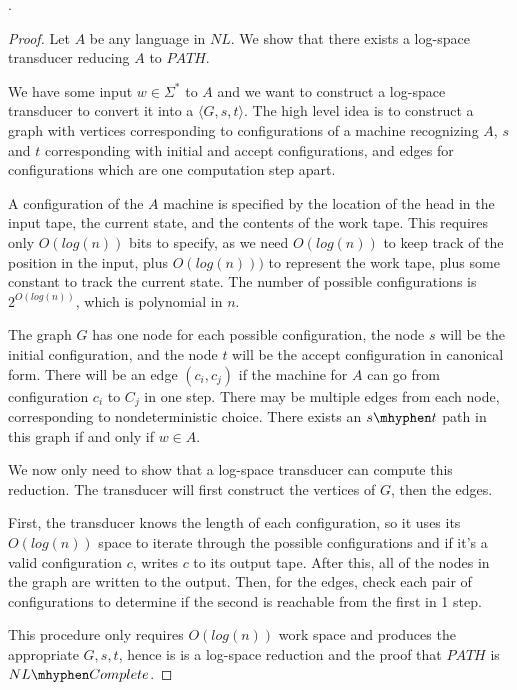 	. 
\begin{proof}	 
	
	Let $A$ be any language in $NL$.  We show that there exists a log-space transducer reducing $A$ to $PATH$.
	
	We have some input $w\in\Sigma^*$ to $A$ and we want to construct a log-space transducer to convert it into a $\langle G,s,t\rangle$.  The high level idea is to construct a graph with vertices corresponding to configurations of a machine recognizing $A$, $s$ and $t$ corresponding with initial and accept configurations, and edges for configurations which are one computation step apart.
	
	A configuration of the $A$ machine is specified by the location of the head in the input tape, the current state, and the contents of the work tape.  This requires only $O(log(n))$ bits to specify, as we need $O(log(n))$ to keep track of the position in the input, plus $O(log(n)))$ to represent the work tape, plus some constant to track the current state.  The number of possible configurations is $2^{O(log(n))}$, which is polynomial in $n$.
	
	The graph $G$ has one node for each possible configuration, the node $s$ will be the initial configuration, and the node $t$ will be the accept configuration in canonical form.  There will be an edge $(c_i,c_j)$ if the machine for $A$ can go from configuration $c_i$ to $C_j$ in one step.  There may be multiple edges from each node, corresponding to nondeterministic choice.  There exists an $s\mhyphen t$ path in this graph if and only if $w\in A$.
	
	We now only need to show that a log-space transducer can compute this reduction.  The transducer will first construct the vertices of $G$, then the edges.
	
	First, the transducer knows the length of each configuration, so it uses its $O(log(n))$ space to iterate through the possible configurations and if it's a valid configuration $c$, writes $c$ to its output tape.  After this, all of the nodes in the graph are written to the output.  Then, for the edges, check each pair of configurations to determine if the second is reachable from the first in 1 step.
	
	This procedure only requires $O(log(n))$ work space and produces the appropriate $G, s,t$, hence is is a log-space reduction and the proof that $PATH$ is $NL\mhyphen Complete$.
	
	
	 
\end{proof}


